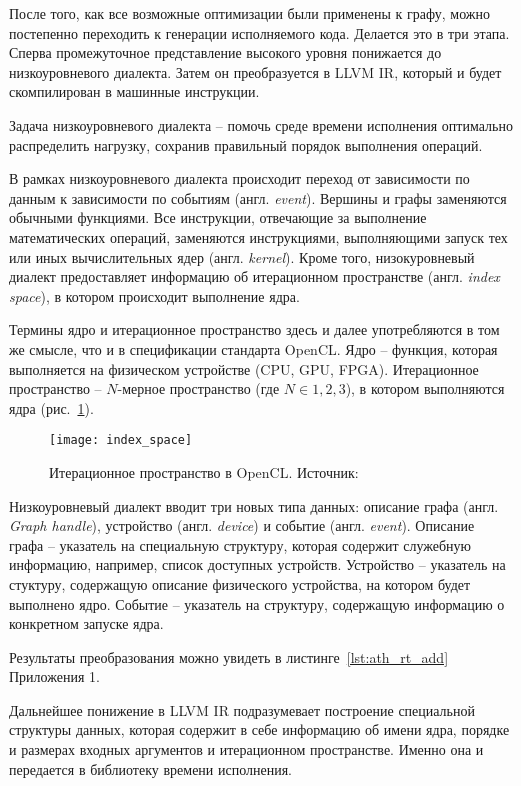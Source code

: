 После того, как все возможные оптимизации были применены к графу, можно
постепенно переходить к генерации исполняемого кода. Делается это в три этапа.
Сперва промежуточное представление высокого уровня понижается до низкоуровневого
диалекта. Затем он преобразуется в LLVM IR, который и будет скомпилирован
в машинные инструкции.

Задача низкоуровневого диалекта -- помочь среде времени исполнения оптимально
распределить нагрузку, сохранив правильный порядок выполнения операций.

В рамках низкоуровневого диалекта происходит переход от зависимости по данным
к зависимости по событиям (англ. \textit{event}). Вершины и графы заменяются 
обычными функциями. Все инструкции, отвечающие за выполнение математических 
операций, заменяются инструкциями, выполняющими запуск тех или иных 
вычислительных ядер (англ. \textit{kernel}). Кроме того, низокуровневый диалект
предоставляет информацию об итерационном пространстве
(англ. \textit{index space}), в котором происходит выполнение ядра.

Термины ядро и итерационное пространство здесь и далее употребляются в том же
смысле, что и в спецификации стандарта OpenCL. Ядро -- функция, которая
выполняется на физическом устройстве (CPU, GPU, FPGA). Итерационное пространство
-- $N$-мерное пространство (где $N \in {1, 2, 3}$), в котором выполняются ядра
(рис.~\ref{fig:index_space}).

\begin{figure}[h]
  \centering
  \texttt{[image: index\_space]}
  \caption{Итерационное пространство в OpenCL. Источник: \cite{opencl3}}
  \label{fig:index_space}
\end{figure}

Низкоуровневый диалект вводит три новых типа данных: описание графа
(англ. \textit{Graph handle}), устройство (англ. \textit{device})
и событие (англ. \textit{event}). Описание графа -- указатель на специальную
структуру, которая содержит служебную информацию, например, список доступных
устройств. Устройство -- указатель на стуктуру, содержащую описание физического
устройства, на котором будет выполнено ядро. Событие -- указатель на структуру,
содержащую информацию о конкретном запуске ядра.

Результаты преобразования можно увидеть в листинге~\ref{lst:ath_rt_add} Приложения 1.

Дальнейшее понижение в LLVM IR подразумевает построение специальной структуры
данных, которая содержит в себе информацию об имени ядра, порядке и размерах
входных аргументов и итерационном пространстве. Именно она и передается
в библиотеку времени исполнения.

